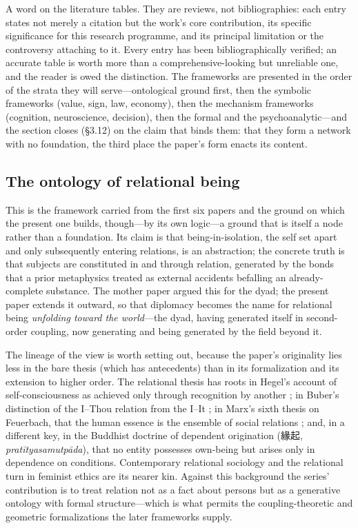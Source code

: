 \documentclass[11pt,a4paper]{article}
\newcommand{\zh}[1]{{\cjk #1}}
\newcommand{\pinkref}[1]{\textcolor{rose}{#1}}
\begin{document}
A word on the literature tables. They are reviews, not bibliographies: each entry states not merely a citation but the work's core contribution, its specific significance for this research programme, and its principal limitation or the controversy attaching to it. Every entry has been bibliographically verified; an accurate table is worth more than a comprehensive-looking but unreliable one, and the reader is owed the distinction. The frameworks are presented in the order of the strata they will serve---ontological ground first, then the symbolic frameworks (value, sign, law, economy), then the mechanism frameworks (cognition, neuroscience, decision), then the formal and the psychoanalytic---and the section closes (\pinkref{§3.12}) on the claim that binds them: that they form a network with no foundation, the third place the paper's form enacts its content.

\subsection{The ontology of relational being}
This is the framework carried from the first six papers and the ground on which the present one builds, though---by its own logic---a ground that is itself a node rather than a foundation. Its claim is that being-in-isolation, the self set apart and only subsequently entering relations, is an abstraction; the concrete truth is that subjects are constituted in and through relation, generated by the bonds that a prior metaphysics treated as external accidents befalling an already-complete substance. The mother paper argued this for the dyad; the present paper extends it outward, so that diplomacy becomes the name for relational being \emph{unfolding toward the world}---the dyad, having generated itself in second-order coupling, now generating and being generated by the field beyond it.

The lineage of the view is worth setting out, because the paper's originality lies less in the bare thesis (which has antecedents) than in its formalization and its extension to higher order. The relational thesis has roots in Hegel's account of self-consciousness as achieved only through recognition by another \parencite{hegel1807}; in Buber's distinction of the I--Thou relation from the I--It \parencite{buber1923}; in Marx's sixth thesis on Feuerbach, that the human essence is the ensemble of social relations \parencite{marx1845theses}; and, in a different key, in the Buddhist doctrine of dependent origination (\zh{緣起}, \emph{pratītyasamutpāda}), that no entity possesses own-being but arises only in dependence on conditions. Contemporary relational sociology \parencite{emirbayer1997manifesto,emirbayer1998agency,crossley2011towards,donati2011relational} and the relational turn in feminist ethics \parencite{mackenzie2000relational} are its nearer kin. Against this background the series' contribution is to treat relation not as a fact about persons but as a generative ontology with formal structure---which is what permits the coupling-theoretic and geometric formalizations the later frameworks supply.
\end{document}
